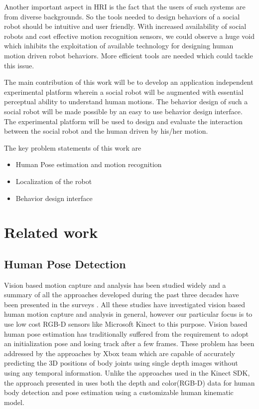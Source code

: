 \documentclass{llncs}
\begin{document}
Another important aspect in HRI is the fact that the users of such systems are from diverse backgrounds. So the tools needed to design behaviors of a social robot should be intuitive and user friendly.  With increased availability of social robots and cost effective motion recognition sensors, we could observe a huge void which inhibits the exploitation of available technology for designing human motion driven robot behaviors. More efficient tools are needed which could tackle this issue.

The main contribution of this work will be to develop an application independent experimental platform wherein a social robot will be augmented with essential perceptual ability to understand human motions. The behavior design of such a social robot will be made possible by an easy to use behavior design interface. The experimental platform will be used to design and evaluate the interaction between the social robot and the human driven by his/her motion.

The key problem statements of this work are
\begin{itemize}
\item Human Pose estimation and motion recognition
\item Localization of the robot
\item Behavior design interface
\end{itemize}
%
\section{Related work}
%
\subsection{Human Pose Detection}
%
Vision based motion capture and analysis has been studied widely and a summary of all the approaches developed during the past three decades have been presented in the surveys \cite{Moeslund2001231} \cite{Moeslund200690}\cite{Poppe20074}. All these studies have investigated vision based human motion capture and analysis in general, however our particular focus is to use low cost RGB-D sensors like Microsoft Kinect\cite{Kinect2014} to this purpose. Vision based human pose estimation has traditionally suffered from the requirement to adopt an initialization pose and losing track after a few frames. These problem has been addressed by the approaches by Xbox\cite{Kinect2014} team which are capable of accurately predicting the 3D positions of body joints using single depth images without using any temporal information\cite{Shotton2011}\cite{Shotton2013}. Unlike the approaches used in the Kinect SDK, the approach presented in \cite{Buys201439} uses both the depth and color(RGB-D) data for human body detection and pose estimation using a customizable human kinematic model. 
%
%
\end{document}
